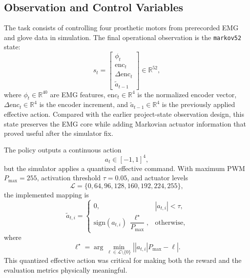 \documentclass[conference]{IEEEtran}
\begin{document}
\subsection{Observation and Control Variables}
The task consists of controlling four prosthetic motors from prerecorded EMG and glove data in simulation. The final operational observation is the \texttt{markov52} state:
\begin{equation}
s_t =
\begin{bmatrix}
\phi_t \\
\mathrm{enc}_t \\
\Delta \mathrm{enc}_t \\
\tilde{a}_{t-1}
\end{bmatrix}
\in \mathbb{R}^{52},
\end{equation}
where $\phi_t \in \mathbb{R}^{40}$ are EMG features, $\mathrm{enc}_t \in \mathbb{R}^{4}$ is the normalized encoder vector, $\Delta \mathrm{enc}_t \in \mathbb{R}^{4}$ is the encoder increment, and $\tilde{a}_{t-1} \in \mathbb{R}^{4}$ is the previously applied effective action. Compared with the earlier project-state observation design, this state preserves the EMG core while adding Markovian actuator information that proved useful after the simulator fix.

The policy outputs a continuous action
\begin{equation}
a_t \in [-1,1]^4,
\end{equation}
but the simulator applies a quantized effective command. With maximum PWM $P_{\max}=255$, activation threshold $\tau = 0.05$, and actuator levels
\begin{equation}
\mathcal{L} = \{0,64,96,128,160,192,224,255\},
\end{equation}
the implemented mapping is
\begin{equation}
\tilde{a}_{t,i} =
\begin{cases}
0, & |a_{t,i}| < \tau,\\[4pt]
\mathrm{sign}(a_{t,i}) \, \dfrac{\ell^\star}{P_{\max}}, & \text{otherwise},
\end{cases}
\end{equation}
where
\begin{equation}
\ell^\star = \arg \min_{\ell \in \mathcal{L}\setminus\{0\}} \left| |a_{t,i}| P_{\max} - \ell \right|.
\end{equation}
This quantized effective action was critical for making both the reward and the evaluation metrics physically meaningful.
\end{document}
